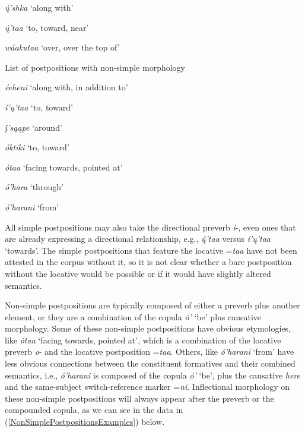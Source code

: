 \begin{exe}
\begin{xlist}
\item \textit{ų́'shka} `along with'

\item \textit{ų́'taa} `to, toward, near'

\item \textit{wáakutaa} `over, over the top of'

\end{xlist}

\item\label{ListOfPostpositions2} List of postpositions with non-simple morphology

\begin{xlist}
\item \textit{éeheni} `along with, in addition to'
\item \textit{í'ų'taa} `to, toward'
\item \textit{į́'sąąpe} `around'
\item \textit{óktiki} `to, toward'
\item \textit{ótaa} `facing towards, pointed at'
\item \textit{ó'hara} `through'
\item \textit{ó'harani} `from'
\end{xlist}

\end{exe}

All simple postpositions may also take the directional preverb \textit{i}-, even ones that are already expressing a directional relationship, e.g., \textit{ų́'taa} versus \textit{í'ų'taa} `towards'. The simple postpositions that feature the locative =\textit{taa} have not been attested in the corpus  without it, so it is not clear whether a bare postposition without the locative would be possible or if it would have slightly altered semantics.

Non-simple postpositions are typically composed of either a preverb plus another element, or they are a combination of the copula \textit{ó'} `be' plus causative morphology. Some of these non-simple postpositions have obvious etymologies, like \textit{ótaa} `facing towards, pointed at', which is a combination of the locative preverb \textit{o}- and the locative postposition =\textit{taa}. Others, like \textit{ó'harani} `from' have less obvious connections between the constituent formatives and their combined semantics, i.e., \textit{ó'harani} is composed of the copula \textit{ó'} `be', plus the causative \textit{here} and the same-subject switch-reference marker =\textit{ni}. Inflectional morphology on these non-simple postpositions will always appear after the preverb or the compounded copula, as we can see in the data  in (\ref{NonSimplePostpositionsExamples}) below.

